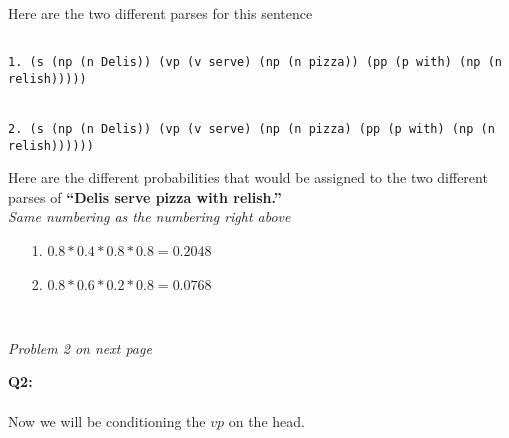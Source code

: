 \documentclass[ruled]{article}
\begin{document}
Here are the two different parses for this sentence
\begin{verbatim}

1. (s (np (n Delis)) (vp (v serve) (np (n pizza)) (pp (p with) (np (n relish)))))


2. (s (np (n Delis)) (vp (v serve) (np (n pizza) (pp (p with) (np (n relish))))))

\end{verbatim}
Here are the different probabilities that would be assigned to the two different parses of \textbf{“Delis serve pizza with relish.”}\\  
\textit{Same numbering as the numbering right above}\\
\begin{itemize}
\item[1. ] $0.8 * 0.4 * 0.8 * 0.8 = 0.2048$
\item[2. ] $0.8 * 0.6 * 0.2 * 0.8 = 0.0768$
\end{itemize}
\begin{verbatim}


\end{verbatim}
\begin{center}
\textit{Problem 2 on next page}
\end{center}
\newpage

\textbf{Q2: } \\  \\
Now we will be conditioning the $vp$ on the head.
\end{document}
